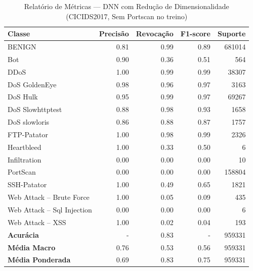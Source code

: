 \begin{table}[H]
    \centering
    \small
    \begin{tabular}{lrrrr}
        \hline
        Classe                     & Precisão & Revocação & F1-score & Suporte \\
        \hline
        BENIGN                     & 0.81     & 0.99      & 0.89     & 681014  \\
        Bot                        & 0.90     & 0.36      & 0.51     & 564     \\
        DDoS                       & 1.00     & 0.99      & 0.99     & 38307   \\
        DoS GoldenEye              & 0.98     & 0.96      & 0.97     & 3163    \\
        DoS Hulk                   & 0.95     & 0.99      & 0.97     & 69267   \\
        DoS Slowhttptest           & 0.88     & 0.98      & 0.93     & 1658    \\
        DoS slowloris              & 0.86     & 0.88      & 0.87     & 1757    \\
        FTP-Patator                & 1.00     & 0.98      & 0.99     & 2326    \\
        Heartbleed                 & 1.00     & 0.33      & 0.50     & 6       \\
        Infiltration               & 0.00     & 0.00      & 0.00     & 10      \\
        PortScan                   & 0.00     & 0.00      & 0.00     & 158804  \\
        SSH-Patator                & 1.00     & 0.49      & 0.65     & 1821    \\
        Web Attack – Brute Force   & 1.00     & 0.05      & 0.09     & 435     \\
        Web Attack – Sql Injection & 0.00     & 0.00      & 0.00     & 6       \\
        Web Attack – XSS           & 1.00     & 0.02      & 0.04     & 193     \\
        \hline
        \textbf{Acurácia}          & -        & 0.83      & -        & 959331  \\
        \textbf{Média Macro}       & 0.76     & 0.53      & 0.56     & 959331  \\
        \textbf{Média Ponderada}   & 0.69     & 0.83      & 0.75     & 959331  \\
        \hline
    \end{tabular}
    \caption{Relatório de Métricas — DNN com Redução de Dimensionalidade (CICIDS2017, Sem Portscan no treino)}
    \label{table:dnn_cicids_reducao_sem_portscan_metricas}
\end{table}

